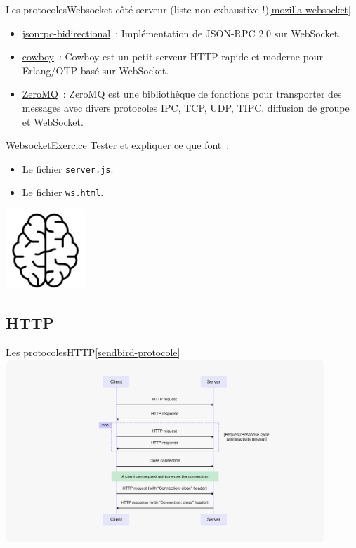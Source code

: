 \documentclass{beamer}
\begin{document}
\begin{frame}{Les protocoles}{Websocket côté serveur (liste non exhaustive !)\cref{mozilla-websocket}}
\begin{scriptsize}
\begin{itemize}
                \item \href{https://github.com/bigstepinc/jsonrpc-bidirectional}{jsonrpc-bidirectional}~: Implémentation de JSON-RPC 2.0 sur WebSocket.

                \item \href{https://github.com/ninenines/cowboy}{cowboy}~: Cowboy est un petit serveur HTTP rapide et moderne pour Erlang/OTP basé sur WebSocket.

                \item \href{https://zeromq.org}{ZeroMQ}~: ZeroMQ est une bibliothèque de fonctions pour transporter des messages avec divers protocoles IPC, TCP, UDP, TIPC, diffusion de groupe et WebSocket.

            \end{itemize}
        \end{scriptsize}
    \end{frame}

    \begin{frame}{Websocket}{Exercice \execcounterdispinc{}}
        Tester et expliquer ce que font~:
        \begin{itemize}
            \item Le fichier \lstinline{server.js}.
            \item Le fichier \lstinline{ws.html}.
        \end{itemize}
        \bigbreak
        \centering
        \includegraphics[width=3cm]{image/intelligence}
    \end{frame}

    \subsection{HTTP}\label{subsec:http}

    \begin{frame}{Les protocoles}{HTTP\cref{sendbird-protocole}}
        \centering
        \includegraphics[width=12cm]{image/Tutorial-HTTP-connection-chart}
    \end{frame}
\end{document}
